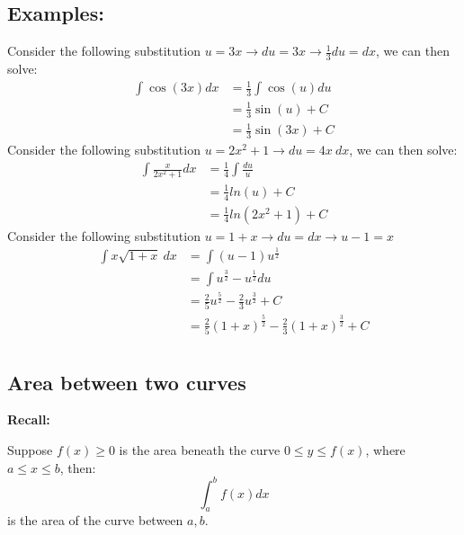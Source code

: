 \documentclass[a4paper]{article}
\begin{document}
  \subsection{Examples:}
  Consider the following substitution $u = 3x \rightarrow du = 3x \rightarrow \frac{1}{3} du = dx$, we can then solve:
  \begin{equation}
    \label{Example 1}
    \begin{split}
      \int \cos (3x) dx   
                        &= \frac{1}{3} \int \cos (u) du \\
                        &= \frac{1}{3} \sin (u) + C \\
                        &= \frac{1}{3} \sin (3x) + C
    \end{split}
  \end{equation}
  Consider the following substitution $u = 2x^2 +1 \rightarrow du = 4x\ dx $, we can then solve:
  \begin{equation}
    \label{Example 2}
    \begin{split}
      \int \frac{x }{2x^2+1} dx &= \frac{1}{4} \int \frac{du }{u}\\
                                &= \frac{1}{4} ln(u) + C\\
                                &= \frac{1}{4} ln (2x^2+1) + C
    \end{split}
  \end{equation}
  Consider the following substitution $ u = 1+x \rightarrow du = dx \rightarrow u - 1 = x$
  \begin{equation}
    \label{Example 3}
    \begin{split}
      \int x \sqrt{1+x}\ dx &= \int (u-1) u ^{\frac{1 }{2}} \\
                            &= \int u^{\frac{3 }{2}} - u^{\frac{1 }{2 }}du \\
                            &= \frac{2 }{5} u^{\frac{5 }{2 }} - \frac{2 }{3} u^{\frac{3 }{2}} + C\\
                            &= \frac{2 }{5} (1+x)^{\frac{5 }{2 }} - \frac{2 }{3} (1+x)^{\frac{3 }{2}} + C\\
    \end{split}
  \end{equation}
  \subsection{Area between two curves}
  \textbf{Recall:}

  Suppose $f(x) \geq 0$ is the area beneath the curve $0\le y \le f(x)$, where $a\le x \le b$, then:
  $$
    \displaystyle\int_{a}^{b} f(x) dx  
  $$
  is the area of the curve between $a,b$.
\end{document}
